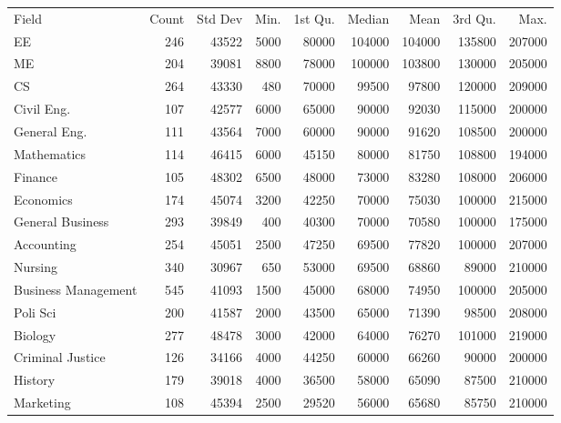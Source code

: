 \documentclass{exam}
\begin{document}
  \begin{table}[ht]
    \centering
    \begin{tabular}{lrrrrrrrr}
      \toprule
      \midrule
      Field                & Count & Std Dev & Min. & 1st Qu. & Median & Mean   & 3rd Qu. & Max. \\
      EE                   & 246   & 43522   & 5000 & 80000   & 104000 & 104000 & 135800  & 207000 \\
      ME                   & 204   & 39081   & 8800 & 78000   & 100000 & 103800 & 130000  & 205000 \\
      CS                   & 264   & 43330   & 480  & 70000   & 99500  & 97800  & 120000  & 209000 \\
      Civil Eng.           & 107   & 42577   & 6000 & 65000   & 90000  & 92030  & 115000  & 200000 \\
      General Eng.         & 111   & 43564   & 7000 & 60000   & 90000  & 91620  & 108500  & 200000 \\
      Mathematics          & 114   & 46415   & 6000 & 45150   & 80000  & 81750  & 108800  & 194000 \\
      Finance              & 105   & 48302   & 6500 & 48000   & 73000  & 83280  & 108000  & 206000 \\
      Economics            & 174   & 45074   & 3200 & 42250   & 70000  & 75030  & 100000  & 215000 \\
      General Business     & 293   & 39849   & 400  & 40300   & 70000  & 70580  & 100000  & 175000 \\
      Accounting           & 254   & 45051   & 2500 & 47250   & 69500  & 77820  & 100000  & 207000 \\
      Nursing              & 340   & 30967   & 650  & 53000   & 69500  & 68860  & 89000   & 210000 \\
      Business Management  & 545   & 41093   & 1500 & 45000   & 68000  & 74950  & 100000  & 205000 \\
      Poli Sci             & 200   & 41587   & 2000 & 43500   & 65000  & 71390  & 98500   & 208000 \\
      Biology              & 277   & 48478   & 3000 & 42000   & 64000  & 76270  & 101000  & 219000 \\
      Criminal Justice     & 126   & 34166   & 4000 & 44250   & 60000  & 66260  & 90000   & 200000 \\
      History              & 179   & 39018   & 4000 & 36500   & 58000  & 65090  & 87500   & 210000 \\
      Marketing            & 108   & 45394   & 2500 & 29520   & 56000  & 65680  & 85750   & 210000 \\

\end{tabular}
\end{table}
\end{document}
